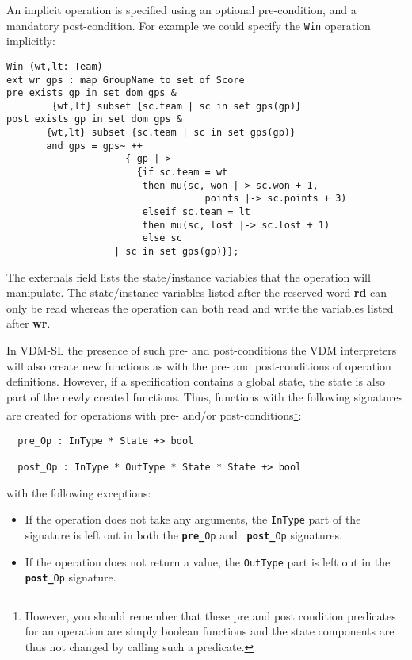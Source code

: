\documentclass{overturerepchap}
\newcommand{\keyw}[1]{{\bf\ttfamily #1}}
\begin{document}
{\begin{description}
An implicit operation is specified using an optional pre-condition,
and a mandatory post-condition. For example we could specify the
\texttt{Win} operation implicitly:
\begin{lstlisting}
Win (wt,lt: Team)
ext wr gps : map GroupName to set of Score
pre exists gp in set dom gps &
        {wt,lt} subset {sc.team | sc in set gps(gp)}
post exists gp in set dom gps &
       {wt,lt} subset {sc.team | sc in set gps(gp)}
       and gps = gps~ ++
                     { gp |->
                       {if sc.team = wt
                        then mu(sc, won |-> sc.won + 1,
                                   points |-> sc.points + 3)
                        elseif sc.team = lt
                        then mu(sc, lost |-> sc.lost + 1)
                        else sc
                   | sc in set gps(gp)}};
\end{lstlisting}

The externals field lists the state/instance
variables that the
operation will manipulate. The
state/instance
variables listed after the reserved
word \keyw{rd} can only be read whereas the operation can both read and
write the variables listed after \keyw{wr}.

In VDM-SL the presence of such pre- and post-conditions the VDM interpreters will also
create new functions as with the pre- and post-conditions of operation
definitions.  However, if a specification contains a global state, the
state is also part of the newly created functions. Thus, functions
with the following signatures are created for operations with pre-
and/or post-conditions\footnote{However, you should remember that
these pre and post condition predicates for an operation are simply
boolean functions and the state components are thus not changed by
calling such a predicate.}:
\begin{lstlisting}
  pre_Op : InType * State +> bool

  post_Op : InType * OutType * State * State +> bool
\end{lstlisting}
with the following exceptions:
\begin{itemize}
\item If the operation does not take any arguments, the {\tt InType} part
  of the signature is left out in both the {\tt \keyw{pre\_}Op} and {\tt
    \keyw{post\_}Op} signatures.

\item If the operation does not return a value, the {\tt OutType} part is
  left out in the {\tt \keyw{post\_}Op} signature.


\end{itemize}
\end{description}}
\end{document}
